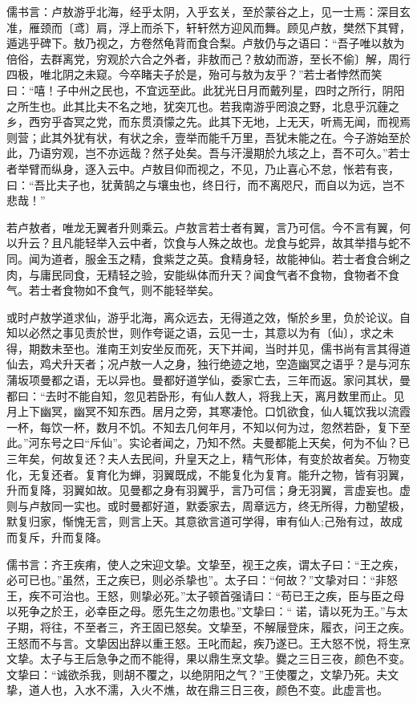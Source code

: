 \documentclass[]{article}
\begin{document}
儒书言：卢敖游乎北海，经乎太阴，入乎玄关，至於蒙谷之上，见一士焉：深目玄准，雁颈而〔鸢〕肩，浮上而杀下，轩轩然方迎风而舞。顾见卢敖，樊然下其臂，遁逃乎碑下。敖乃视之，方卷然龟背而食合梨。卢敖仍与之语曰：``吾子唯以敖为倍俗，去群离党，穷观於六合之外者，非敖而己？敖幼而游，至长不偷〕解，周行四极，唯北阴之未窥。今卒睹夫子於是，殆可与敖为友乎？''若士者悖然而笑曰：``嘻！子中州之民也，不宜远至此。此犹光日月而戴列星，四时之所行，阴阳之所生也。此其比夫不名之地，犹突兀也。若我南游乎罔浪之野，北息乎沉薶之乡，西穷乎杳冥之党，而东贯湏懞之先。此其下无地，上无天，听焉无闻，而视焉则营；此其外犹有状，有状之余，壹举而能千万里，吾犹未能之在。今子游始至於此，乃语穷观，岂不亦远哉？然子处矣。吾与汗漫期於九垓之上，吾不可久。''若士者举臂而纵身，逐入云中。卢敖目仰而视之，不见，乃止喜心不怠，怅若有丧，曰：``吾比夫子也，犹黄鹄之与壤虫也，终日行，而不离咫尺，而自以为远，岂不悲哉！''

若卢敖者，唯龙无翼者升则乘云。卢敖言若士者有翼，言乃可信。今不言有翼，何以升云？且凡能轻举入云中者，饮食与人殊之故也。龙食与蛇异，故其举措与蛇不同。闻为道者，服金玉之精，食紫芝之英。食精身轻，故能神仙。若士者食合蜊之肉，与庸民同食，无精轻之验，安能纵体而升天？闻食气者不食物，食物者不食气。若士者食物如不食气，则不能轻举矣。

或时卢敖学道求仙，游乎北海，离众远去，无得道之效，惭於乡里，负於论议。自知以必然之事见责於世，则作夸诞之语，云见一士，其意以为有〔仙〕，求之未得，期数未至也。淮南王刘安坐反而死，天下并闻，当时并见，儒书尚有言其得道仙去，鸡犬升天者；况卢敖一人之身，独行绝迹之地，空造幽冥之语乎？是与河东蒲坂项曼都之语，无以异也。曼都好道学仙，委家亡去，三年而返。家问其状，曼都曰：``去时不能自知，忽见若卧形，有仙人数人，将我上天，离月数里而止。见月上下幽冥，幽冥不知东西。居月之旁，其寒凄怆。口饥欲食，仙人辄饮我以流霞一杯，每饮一杯，数月不饥。不知去几何年月，不知以何为过，忽然若卧，复下至此。''河东号之曰``斥仙''。实论者闻之，乃知不然。夫曼都能上天矣，何为不仙？已三年矣，何故复还？夫人去民间，升皇天之上，精气形体，有变於故者矣。万物变化，无复还者。复育化为蝉，羽翼既成，不能复化为复育。能升之物，皆有羽翼，升而复降，羽翼如故。见曼都之身有羽翼乎，言乃可信；身无羽翼，言虚妄也。虚则与卢敖同一实也。或时曼都好道，默委家去，周章远方，终无所得，力勌望极，默复归家，惭愧无言，则言上天。其意欲言道可学得，审有仙人;己殆有过，故成而复斥，升而复降。

儒书言：齐王疾痏，使人之宋迎文挚。文挚至，视王之疾，谓太子曰：``王之疾，必可已也。''虽然，王之疾已，则必杀挚也''。太子曰：``何故？''文挚对曰：``非怒王，疾不可治也。王怒，则挚必死。''太子顿首强请曰：``苟已王之疾，臣与臣之母以死争之於王，必幸臣之母。愿先生之勿患也。''文挚曰：``
诺，请以死为王。''与太子期，将往，不至者三，齐王固已怒矣。文挚至，不解屦登床，履衣，问王之疾。王怒而不与言。文挚因出辞以重王怒。王叱而起，疾乃遂已。王大怒不悦，将生烹文挚。太子与王后急争之而不能得，果以鼎生烹文挚。爨之三日三夜，颜色不变。文挚曰：``诚欲杀我，则胡不覆之，以绝阴阳之气？''王使覆之，文挚乃死。夫文挚，道人也，入水不濡，入火不燋，故在鼎三日三夜，颜色不变。此虚言也。
\end{document}
